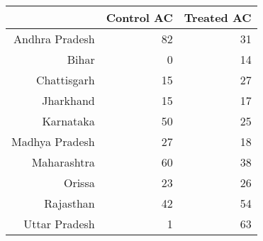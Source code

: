 \begin{tabular}{rrr}
  \hline
 & Control AC & Treated AC \\ 
  \hline
Andhra Pradesh &  82 &  31 \\ 
  Bihar &   0 &  14 \\ 
  Chattisgarh &  15 &  27 \\ 
  Jharkhand &  15 &  17 \\ 
  Karnataka &  50 &  25 \\ 
  Madhya Pradesh &  27 &  18 \\ 
  Maharashtra &  60 &  38 \\ 
  Orissa &  23 &  26 \\ 
  Rajasthan &  42 &  54 \\ 
  Uttar Pradesh &   1 &  63 \\ 
   \hline
\end{tabular}

